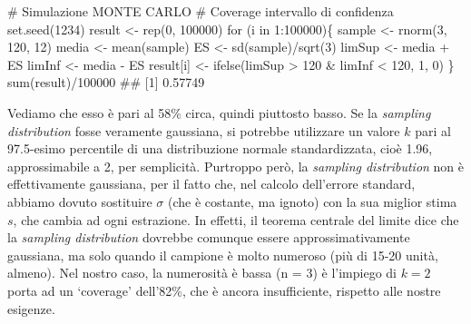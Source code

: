 \documentclass[a4paper,12pt,oneside]{book}
\newenvironment{Shaded}{\begin{snugshade}}{\end{snugshade}}
\newcommand{\DecValTok}[1]{#1}
\newcommand{\SpecialCharTok}[1]{#1}
\newcommand{\CommentTok}[1]{#1}
\newcommand{\DocumentationTok}[1]{#1}
\newcommand{\OtherTok}[1]{#1}
\newcommand{\FunctionTok}[1]{#1}
\newcommand{\ControlFlowTok}[1]{#1}
\newcommand{\NormalTok}[1]{#1}
\begin{document}
\begin{Shaded}
\begin{Highlighting}[]
\CommentTok{\# Simulazione MONTE CARLO}
\CommentTok{\# Coverage intervallo di confidenza}
\FunctionTok{set.seed}\NormalTok{(}\DecValTok{1234}\NormalTok{)}
\NormalTok{result }\OtherTok{\textless{}{-}} \FunctionTok{rep}\NormalTok{(}\DecValTok{0}\NormalTok{, }\DecValTok{100000}\NormalTok{)}
\ControlFlowTok{for}\NormalTok{ (i }\ControlFlowTok{in} \DecValTok{1}\SpecialCharTok{:}\DecValTok{100000}\NormalTok{)\{}
\NormalTok{  sample }\OtherTok{\textless{}{-}} \FunctionTok{rnorm}\NormalTok{(}\DecValTok{3}\NormalTok{, }\DecValTok{120}\NormalTok{, }\DecValTok{12}\NormalTok{)}
\NormalTok{  media }\OtherTok{\textless{}{-}} \FunctionTok{mean}\NormalTok{(sample)}
\NormalTok{  ES }\OtherTok{\textless{}{-}} \FunctionTok{sd}\NormalTok{(sample)}\SpecialCharTok{/}\FunctionTok{sqrt}\NormalTok{(}\DecValTok{3}\NormalTok{)}
\NormalTok{  limSup }\OtherTok{\textless{}{-}}\NormalTok{ media }\SpecialCharTok{+}\NormalTok{ ES}
\NormalTok{  limInf }\OtherTok{\textless{}{-}}\NormalTok{ media }\SpecialCharTok{{-}}\NormalTok{ ES}
\NormalTok{  result[i] }\OtherTok{\textless{}{-}} \FunctionTok{ifelse}\NormalTok{(limSup }\SpecialCharTok{\textgreater{}} \DecValTok{120} \SpecialCharTok{\&}\NormalTok{ limInf }\SpecialCharTok{\textless{}} \DecValTok{120}\NormalTok{, }\DecValTok{1}\NormalTok{, }\DecValTok{0}\NormalTok{)}
\NormalTok{\}}
\FunctionTok{sum}\NormalTok{(result)}\SpecialCharTok{/}\DecValTok{100000}
\DocumentationTok{\#\# [1] 0.57749}
\end{Highlighting}
\end{Shaded}

Vediamo che esso è pari al 58\% circa, quindi piuttosto basso. Se la \emph{sampling distribution} fosse veramente gaussiana, si potrebbe utilizzare un valore \(k\) pari al 97.5-esimo percentile di una distribuzione normale standardizzata, cioè 1.96, approssimabile a 2, per semplicità. Purtroppo però, la \emph{sampling distribution} non è effettivamente gaussiana, per il fatto che, nel calcolo dell'errore standard, abbiamo dovuto sostituire \(\sigma\) (che è costante, ma ignoto) con la sua miglior stima \(s\), che cambia ad ogni estrazione. In effetti, il teorema centrale del limite dice che la \emph{sampling distribution} dovrebbe comunque essere approssimativamente gaussiana, ma solo quando il campione è molto numeroso (più di 15-20 unità, almeno). Nel nostro caso, la numerosità è bassa (n = 3) è l'impiego di \(k = 2\) porta ad un `coverage' dell'82\%, che è ancora insufficiente, rispetto alle nostre esigenze.
\end{document}
